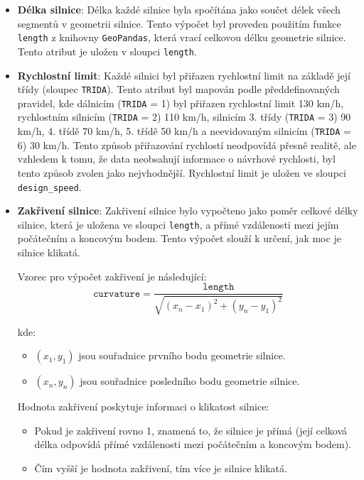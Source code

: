 \begin{itemize}
    \item \textbf{Délka silnice}: Délka každé silnice byla spočítána jako součet délek všech segmentů v geometrii silnice. Tento výpočet byl proveden použitím funkce \texttt{length} z knihovny \texttt{GeoPandas}, která vrací celkovou délku geometrie silnice. Tento atribut je uložen v sloupci \texttt{length}.
    
    \item \textbf{Rychlostní limit}: Každé silnici byl přiřazen rychlostní limit na základě její třídy (sloupec \texttt{TRIDA}). Tento atribut byl mapován podle předdefinovaných pravidel, kde dálnicím (\texttt{TRIDA} = 1) byl přiřazen rychlostní limit 130 km/h, rychlostním silnicím (\texttt{TRIDA} = 2) 110 km/h, silnicím 3. třídy (\texttt{TRIDA} = 3) 90 km/h, 4. třídě 70 km/h, 5. třídě 50 km/h a neevidovaným silnicím (\texttt{TRIDA} = 6) 30 km/h. Tento způsob přiřazování rychlostí neodpovídá přesně realitě, ale vzhledem k tomu, že data neobsahují informace o návrhové rychlosti, byl tento způsob zvolen jako nejvhodnější. Rychlostní limit je uložen ve sloupci \texttt{design\_speed}.
    
    \item \textbf{Zakřivení silnice}: Zakřivení silnice bylo vypočteno jako poměr celkové délky silnice, která je uložena ve sloupci \texttt{length}, a přímé vzdálenosti mezi jejím počátečním a koncovým bodem. Tento výpočet slouží k určení, jak moc je silnice klikatá.
    
    Vzorec pro výpočet zakřivení je následující:
    \[
    \texttt{curvature} = \frac{\texttt{length}}{\sqrt{(x_n - x_1)^2 + (y_n - y_1)^2}}
    \]

    kde:
    \begin{itemize}
        \item \((x_1, y_1)\) jsou souřadnice prvního bodu geometrie silnice.
        \item \((x_n, y_n)\) jsou souřadnice posledního bodu geometrie silnice.
    \end{itemize}
    
    Hodnota zakřivení poskytuje informaci o klikatost silnice:
    \begin{itemize}
        \item Pokud je zakřivení rovno 1, znamená to, že silnice je přímá (její celková délka odpovídá přímé vzdálenosti mezi počátečním a koncovým bodem).
        \item Čím vyšší je hodnota zakřivení, tím více je silnice klikatá.
    \end{itemize}
    

\end{itemize}
